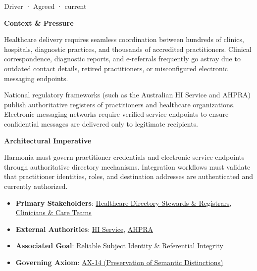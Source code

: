 \label{element:5ea7e57dcde04ef88c19a88ade9af6ca}
{\small Driver · Agreed · current}\par

\par\medskip\textbf{Context \& Pressure}\par


Healthcare delivery requires seamless coordination between hundreds of clinics, hospitals, diagnostic practices, and thousands of accredited practitioners. Clinical correspondence, diagnostic reports, and e-referrals frequently go astray due to outdated contact details, retired practitioners, or misconfigured electronic messaging endpoints.



National regulatory frameworks (such as the Australian HI Service and AHPRA) publish authoritative registers of practitioners and healthcare organizations. Electronic messaging networks require verified service endpoints to ensure confidential messages are delivered only to legitimate recipients.



\par\medskip\textbf{Architectural Imperative}\par


Harmonia must govern practitioner credentials and electronic service endpoints through authoritative directory mechanisms. Integration workflows must validate that practitioner identities, roles, and destination addresses are authenticated and currently authorized.



\begin{itemize}


\item \textbf{Primary Stakeholders}: \href{\detokenize{../../../../../docs/markdown/01-motivation/stakeholders/enterprise-stakeholders.md}}{Healthcare Directory Stewards \& Registrars}, \href{\detokenize{../../../../../docs/markdown/01-motivation/stakeholders/enterprise-stakeholders.md}}{Clinicians \& Care Teams}

\item \textbf{External Authorities}: \href{\detokenize{../../../../../docs/markdown/01-motivation/stakeholders/external-authorities.md}}{HI Service}, \href{\detokenize{../../../../../docs/markdown/01-motivation/stakeholders/external-authorities.md}}{AHPRA}

\item \textbf{Associated Goal}: \href{\detokenize{../../../../../docs/markdown/01-motivation/goals-outcomes/strategic-goals.md}}{Reliable Subject Identity \& Referential Integrity}

\item \textbf{Governing Axiom}: \hyperref[element:d3fc6025dc7646d1b2020b51f7a44bfa]{AX-14 (Preservation of Semantic Distinctions)}

\end{itemize}

